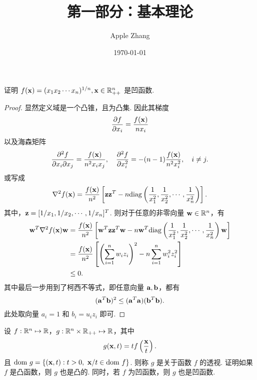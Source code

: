 \documentclass[UTF8]{ctexart}
\title{第一部分：基本理论}
\author{Apple Zhang}
\date{\today}
\begin{document}
\maketitle
\newpage

\begin{problem}
  证明 $f(\mathbf x)=(x_1x_2\cdots x_n)^{1/n}, \mathbf x\in\mathbb R^{n}_{++}$ 是凹函数.
\end{problem}
\begin{proof}
  显然定义域是一个凸锥，且为凸集.
  因此其梯度
  \begin{equation}
    \frac{\partial f}{\partial x_i}=\frac{f(\mathbf x)}{nx_i}
  \end{equation}
  以及海森矩阵
  \begin{equation}
    \frac{\partial^2 f}{\partial x_i\partial x_j}=\frac{f(\mathbf x)}{n^2x_ix_j},\quad
    \frac{\partial^2 f}{\partial x_i^2}=-(n-1)\frac{f(\mathbf x)}{n^2x_i^2},\quad i\not=j.
  \end{equation}
  或写成
  \begin{equation}
    \nabla^2 f(\mathbf x)=\frac{f(\mathbf x)}{n^2}\left[\mathbf z\mathbf z^T-n\mathrm{diag}\left(\frac1{x_1^2}, \frac1{x_2^2}, \cdots, \frac{1}{x^2_n}\right)\right].
  \end{equation}
  其中，$\mathbf z=[1/x_1,1/x_2,\cdots,1/x_n]^T$.
  则对于任意的非零向量 $\mathbf w\in\mathbb R^n$，有
  \begin{align*}
    \mathbf w^T\nabla^2f(\mathbf x)\mathbf w
    &=\frac{f(\mathbf x)}{n^2}\left[\mathbf w^T\mathbf z\mathbf z^T\mathbf w-n\mathbf w^T\mathrm{diag}\left(\frac1{x_1^2}, \frac1{x_2^2}, \cdots, \frac{1}{x^2_n}\right)\mathbf w\right]\\
    &=\frac{f(\mathbf x)}{n^2}\left[\left(\sum_{i=1}^nw_iz_i\right)^2-n\sum_{i=1}^nw_i^2z_i^2\right]\\
    &\leq 0.
  \end{align*}
  其中最后一步用到了柯西不等式，即任意向量 $\mathbf a, \mathbf b$，都有
  \begin{equation}
    (\mathbf a^T\mathbf b)^2\leq(\mathbf a^T\mathbf a)(\mathbf b^T\mathbf b).
  \end{equation}
  此处取向量 $a_i=1$ 和 $b_i=u_iz_i$ 即可.
\end{proof}
\begin{problem}
  设 $f:\mathbb R^n\mapsto\mathbb R$，$g:\mathbb R^n\times \mathbb R_{++}\mapsto\mathbb R$，其中
  \begin{equation}
    g(\mathbf x,t)=tf\left(\frac{\mathbf x}{t}\right).
  \end{equation}
  且 $\mathrm {dom~} g=\{(\mathbf x,t):t>0,~\mathbf x/t\in\mathrm {dom~} f\}$. 则称 $g$ 是关于函数 $f$ 的透视.
  证明如果 $f$ 是凸函数，则 $g$ 也是凸的. 同时，若 $f$ 为凹函数，则 $g$ 也是凹函数.
\end{problem}
\end{document}

